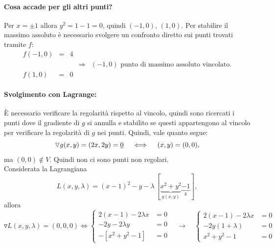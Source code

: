 \begin{example}
	\paragraph{Cosa accade per gli altri punti?} Per $x=\pm 1$ allora $y^2 = 1 - 1 = 0$, quindi $(-1,0),\, (1, 0)$. Per stabilire il massimo assoluto è necessario svolgere un confronto diretto sui punti trovati tramite $f$:
	\begin{equation*}
		\begin{matrix}
			f(-1, 0) &=& 4 && \\
			&&&\Rightarrow& (-1,0)\text{ punto di massimo assoluto vincolato.}\\
			f(1,0) &=& 0 &&
		\end{matrix}
	\end{equation*}
	\paragraph{Svolgimento con Lagrange:} È necessario verificare la regolarità rispetto al vincolo, quindi sono ricercati i punti dove il gradiente di $g$ si annulla e stabilito se questi appartengono al vincolo per verificare la regolarità di $g$ nei punti. Quindi, vale quanto segue:
	\begin{equation*}
		\triangledown g(x,y) = (2x, 2y) = \uline 0\quad \iff \quad (x,y) = (0,0),
	\end{equation*}
	ma $(0,0)\notin V$. Quindi non ci sono punti non regolari.\\
	Considerata la Lagrangiana
	\begin{equation*}
		L(x,y,\lambda) = (x-1)^2 - y - \lambda\,[\underbrace{x^2+y^2}_{g(x,y)}\underbrace{-1}_k],
	\end{equation*}
	allora
	\begin{equation}\label{eq:esempio_sistema_lagrange}
		\triangledown L(x,y,\lambda) = (0,0,0) \iff
		\begin{cases}
			2(x-1) - 2\lambda x &= 0\\
			-2y - 2\lambda y &= 0\\
			-[x^2+y^2-1]&=0
		\end{cases}\quad\rightarrow\quad
		\begin{cases}
			2(x-1) - 2 \lambda x &=0\\
			-2 y(1 + \lambda) &= 0\\
			x^2 + y^2 - 1 &= 0
		\end{cases}
	\end{equation}

\end{example}
